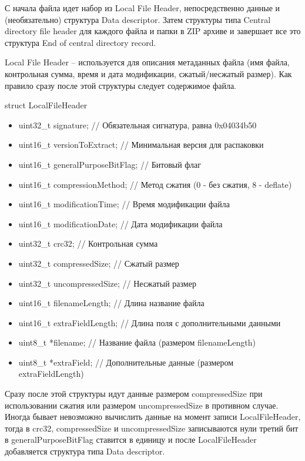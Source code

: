 С начала файла идет набор из Local File Header, непосредственно данные и (необязательно) структура Data descriptor. Затем структуры типа Central directory file header для каждого файла и папки в ZIP архиве и завершает все это структура End of central directory record.

Local File Header -- используется для описания метаданных файла (имя файла, контрольная сумма, время и дата модификации, сжатый/несжатый размер). Как правило сразу после этой структуры следует содержимое файла.

struct LocalFileHeader

\begin{itemize}
    \item uint32\_t signature;	// Обязательная сигнатура, равна 0x04034b50
    \item uint16\_t versionToExtract;	// Минимальная версия для распаковки
    \item uint16\_t generalPurposeBitFlag;	// Битовый флаг
    \item uint16\_t compressionMethod;	// Метод сжатия (0 - без сжатия, 8 - deflate)
    \item uint16\_t modificationTime;	// Время модификации файла
    \item uint16\_t modificationDate;	// Дата модификации файла
    \item uint32\_t crc32;				// Контрольная сумма
    \item uint32\_t compressedSize;	// Сжатый размер
    \item uint32\_t uncompressedSize;	// Несжатый размер
    \item uint16\_t filenameLength;	// Длина название файла
    \item uint16\_t extraFieldLength;	// Длина поля с дополнительными данными
    \item uint8\_t *filename;			// Название файла (размером filenameLength)
    \item uint8\_t *extraField;		// Дополнительные данные (размером extraFieldLength)
\end{itemize}

Сразу после этой структуры идут данные размером compressedSize при использовании сжатия или размером uncompressedSize в противном случае.
Иногда бывает невозможно вычислить данные на момент записи LocalFileHeader, тогда в crc32, compressedSize и uncompressedSize записываются нули третий бит в generalPurposeBitFlag ставится в единицу и после LocalFileHeader добавляется структура типа Data descriptor.

